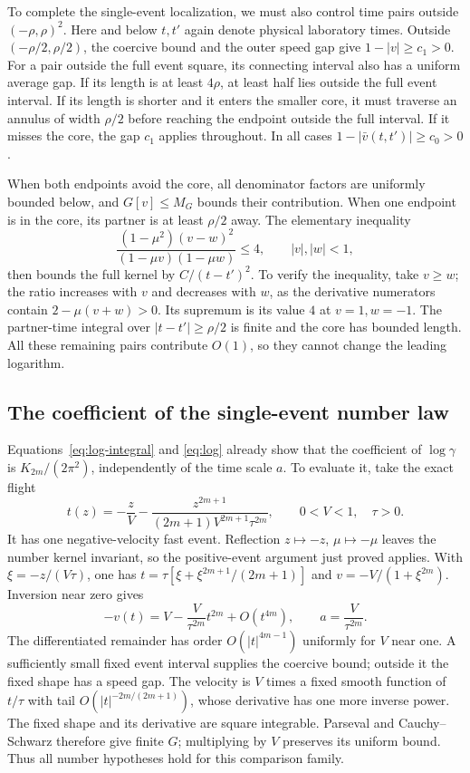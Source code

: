 \documentclass[11pt]{article}
\begin{document}
To complete the single-event localization, we must also control time
pairs outside $(-\rho,\rho)^2$. Here and below $t,t'$ again denote
physical laboratory times. Outside $(-\rho/2,\rho/2)$, the
coercive bound and the outer speed gap give $1-|v|\ge c_1>0$.
For a pair outside the full event square, its connecting interval
also has a uniform average gap. If its length is at least $4\rho$,
at least half lies outside the full event interval. If its length
is shorter and it enters the smaller core, it must traverse an
annulus of width $\rho/2$ before reaching the endpoint outside the
full interval. If it misses the core, the gap $c_1$ applies
throughout. In all cases $1-|\bar v(t,t')|\ge c_0>0$.

When both endpoints avoid the core, all denominator factors are
uniformly bounded below, and $G[v]\le M_G$ bounds their contribution.
When one endpoint is in the core, its partner is at least
$\rho/2$ away. The elementary inequality
\begin{equation}
 \frac{(1-\mu^2)(v-w)^2}{(1-\mu v)(1-\mu w)}\le4,
 \qquad |v|,|w|<1,
 \label{eq:cross}
\end{equation}
then bounds the full kernel by $C/(t-t')^2$.
To verify the inequality, take $v\ge w$; the ratio increases with
$v$ and decreases with $w$, as the derivative numerators contain
$2-\mu(v+w)>0$. Its supremum is its value $4$ at $v=1,w=-1$.
The partner-time integral over $|t-t'|\ge\rho/2$ is finite and the
core has bounded length. All these remaining pairs contribute
$O(1)$, so they cannot change the leading logarithm.

\subsection{The coefficient of the single-event number law}
Equations~\eqref{eq:log-integral} and \eqref{eq:log} already show that
the coefficient of $\log\gamma$ is $K_{2m}/(2\pi^2)$, independently
of the time scale $a$. To evaluate it, take the exact flight
\begin{equation}
 t(z)=-\frac zV-\frac{z^{2m+1}}{(2m+1)V^{2m+1}\tau^{2m}},
 \qquad 0<V<1,\quad \tau>0.
 \label{eq:family}
\end{equation}
It has one negative-velocity fast event. Reflection $z\mapsto-z$,
$\mu\mapsto-\mu$ leaves the number kernel invariant, so the
positive-event argument just proved applies. With
$\xi=-z/(V\tau)$, one has
$t=\tau[\xi+\xi^{2m+1}/(2m+1)]$ and
$v=-V/(1+\xi^{2m})$. Inversion near zero gives
\begin{equation}
 -v(t)=V-\frac V{\tau^{2m}}t^{2m}+O(t^{4m}),
 \qquad a=\frac V{\tau^{2m}}.
 \label{eq:flight-local-profile}
\end{equation}
The differentiated remainder has order $O(|t|^{4m-1})$ uniformly
for $V$ near one. A sufficiently small fixed event interval supplies
the coercive bound; outside it the fixed shape has a speed gap.
The velocity is $V$ times a fixed smooth function of $t/\tau$ with
tail $O(|t|^{-2m/(2m+1)})$, whose derivative has one more inverse
power. The fixed shape and its derivative are square integrable.
Parseval and Cauchy--Schwarz therefore give finite $G$; multiplying
by $V$ preserves its uniform bound. Thus all number hypotheses
hold for this comparison family.
\end{document}
